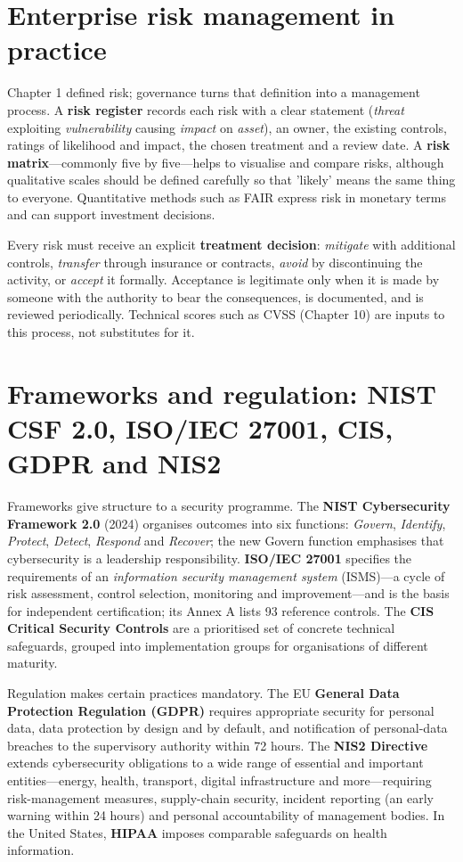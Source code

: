 \documentclass[11pt,openany]{book}
\begin{document}
\section{Enterprise risk management in practice}\label{sec:13.3}
Chapter 1 defined risk; governance turns that definition into a management process. A \textbf{risk register} records each risk with a clear statement (\emph{threat} exploiting \emph{vulnerability} causing \emph{impact} on \emph{asset}), an owner, the existing controls, ratings of likelihood and impact, the chosen treatment and a review date. A \textbf{risk matrix}—commonly five by five—helps to visualise and compare risks, although qualitative scales should be defined carefully so that 'likely' means the same thing to everyone. Quantitative methods such as FAIR express risk in monetary terms and can support investment decisions.

Every risk must receive an explicit \textbf{treatment decision}: \emph{mitigate} with additional controls, \emph{transfer} through insurance or contracts, \emph{avoid} by discontinuing the activity, or \emph{accept} it formally. Acceptance is legitimate only when it is made by someone with the authority to bear the consequences, is documented, and is reviewed periodically. Technical scores such as CVSS (Chapter 10) are inputs to this process, not substitutes for it.

\section{Frameworks and regulation: NIST CSF 2.0, ISO/IEC 27001, CIS, GDPR and NIS2}\label{sec:13.4}
Frameworks give structure to a security programme. The \textbf{NIST Cybersecurity Framework 2.0} (2024) organises outcomes into six functions: \emph{Govern}, \emph{Identify}, \emph{Protect}, \emph{Detect}, \emph{Respond} and \emph{Recover}; the new Govern function emphasises that cybersecurity is a leadership responsibility. \textbf{ISO/IEC 27001} specifies the requirements of an \emph{information security management system} (ISMS)—a cycle of risk assessment, control selection, monitoring and improvement—and is the basis for independent certification; its Annex A lists 93 reference controls. The \textbf{CIS Critical Security Controls} are a prioritised set of concrete technical safeguards, grouped into implementation groups for organisations of different maturity.

Regulation makes certain practices mandatory. The EU \textbf{General Data Protection Regulation (GDPR)} requires appropriate security for personal data, data protection by design and by default, and notification of personal-data breaches to the supervisory authority within 72 hours. The \textbf{NIS2 Directive} extends cybersecurity obligations to a wide range of essential and important entities—energy, health, transport, digital infrastructure and more—requiring risk-management measures, supply-chain security, incident reporting (an early warning within 24 hours) and personal accountability of management bodies. In the United States, \textbf{HIPAA} imposes comparable safeguards on health information.
\end{document}
